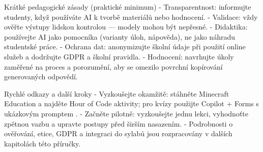 Krátké pedagogické zásady (praktické minimum)
- Transparentnost: informujte studenty, když používáte AI k tvorbě materiálů nebo hodnocení.
- Validace: vždy ověřte výstupy lidskou kontrolou — modely mohou být nepřesné.
- Didaktika: používejte AI jako pomocníka (varianty úloh, nápověda), ne jako náhradu studentské práce.
- Ochrana dat: anonymizujte školní údaje při použití online služeb a dodržujte GDPR a školní pravidla.
- Hodnocení: navrhujte úkoly zaměřené na proces a porozumění, aby se omezilo povrchní kopírování generovaných odpovědí.

Rychlé odkazy a další kroky
- Vyzkoušejte okamžitě: stáhněte Minecraft Education a najděte Hour of Code aktivity; pro kvízy použijte Copilot + Forms s ukázkovým promptem \cite{kb_ai_101_tipu_pdf_04e4a115_page_15_2, kb_ai_101_tipu_pdf_04e4a115_page_36_1}.
- Začněte pilotně: vyzkoušejte jednu lekci, vyhodnoťte zpětnou vazbu a upravte postupy před širším nasazením.
- Podrobnosti o ověřování, etice, GDPR a integraci do sylabů jsou rozpracovány v dalších kapitolách této příručky.